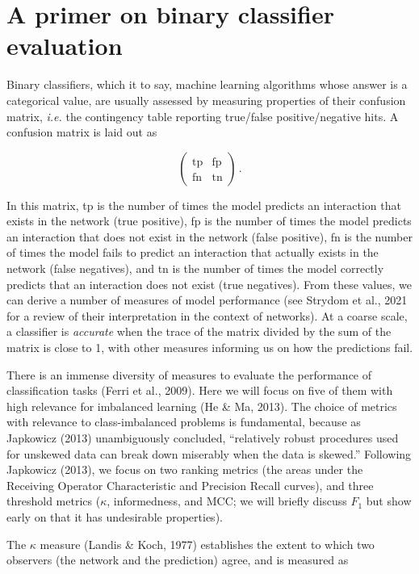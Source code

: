 \documentclass[10pt,oneside]{article}
\begin{document}
\hypertarget{a-primer-on-binary-classifier-evaluation}{%
\section{A primer on binary classifier
evaluation}\label{a-primer-on-binary-classifier-evaluation}}

Binary classifiers, which it to say, machine learning algorithms whose
answer is a categorical value, are usually assessed by measuring
properties of their confusion matrix, \emph{i.e.} the contingency table
reporting true/false positive/negative hits. A confusion matrix is laid
out as

\[\begin{pmatrix}
    \text{tp} & \text{fp} \\
    \text{fn} & \text{tn}
\end{pmatrix} \,.\]

In this matrix, tp is the number of times the model predicts an
interaction that exists in the network (true positive), fp is the number
of times the model predicts an interaction that does not exist in the
network (false positive), fn is the number of times the model fails to
predict an interaction that actually exists in the network (false
negatives), and tn is the number of times the model correctly predicts
that an interaction does not exist (true negatives). From these values,
we can derive a number of measures of model performance (see Strydom et
al., 2021 for a review of their interpretation in the context of
networks). At a coarse scale, a classifier is \emph{accurate} when the
trace of the matrix divided by the sum of the matrix is close to 1, with
other measures informing us on how the predictions fail.

There is an immense diversity of measures to evaluate the performance of
classification tasks (Ferri et al., 2009). Here we will focus on five of
them with high relevance for imbalanced learning (He \& Ma, 2013). The
choice of metrics with relevance to class-imbalanced problems is
fundamental, because as Japkowicz (2013) unambiguously concluded,
``relatively robust procedures used for unskewed data can break down
miserably when the data is skewed.'' Following Japkowicz (2013), we
focus on two ranking metrics (the areas under the Receiving Operator
Characteristic and Precision Recall curves), and three threshold metrics
(\(\kappa\), informedness, and MCC; we will briefly discuss \(F_1\) but
show early on that it has undesirable properties).

The \(\kappa\) measure (Landis \& Koch, 1977) establishes the extent to
which two observers (the network and the prediction) agree, and is
measured as
\end{document}
